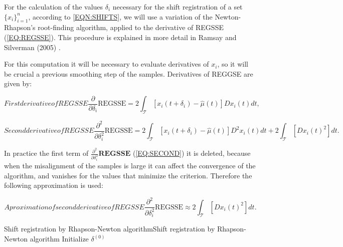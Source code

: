 

For the calculation of the values $\delta_i$ necessary for the shift registration of a set  $\{x_i\}_{i=1}^{n}$, according to \ref{EQN:SHIFTS},
we will use a variation of the Newton-Rhapson's root-finding algorithm, applied
to the derivative of REGSSE (\ref{EQ:REGSSE}). This procedure is explained in more detail
in Ramsay and Silverman (2005) \cite{Ramsay2005}.

For this computation it will be necessary to evaluate derivatives of
$x_i$, so it will be crucial a previous smoothing step of the samples.
Derivatives of REGGSE are given by:

\begin{equation}[EQ:FIRST]{First derivative of REGSSE}
\frac{\partial}{\partial \delta_i} \text{REGSSE} = 2 \int_{\mathcal{T}}
\left [ x_i(t + \delta_i) - \hat \mu(t) \right ] Dx_i(t) dt,
\end{equation}

\begin{equation}[EQ:SECOND]{Second derivative of REGSSE}
\frac{\partial^2}{\partial \delta^2_i} \text{REGSSE} = 2
\int_{\mathcal{T}} \left [ x_i(t + \delta_i) - \hat \mu(t) \right ]
D^2x_i(t) dt + 2 \int_{\mathcal{T}} \left [  Dx_i(t)^2 \right ]  dt.
\end{equation}

In practice the first term of $\frac{\partial^2}{\partial \delta^2_i}\textbf{REGSSE}$
(\ref{EQ:SECOND}) it is deleted, because when the misalignment of the samples is large it
can affect the convergence of the algorithm, and vanishes for the values that
minimize the criterion. Therefore the following approximation is used:

\begin{equation}[]{Aproximation of second derivative of REGSSE}
\frac{\partial^2}{\partial \delta^2_i} \text{REGSSE} \approx  
2 \int_{\mathcal{T}} \left [  Dx_i(t)^2 \right ]  dt.
\end{equation}

\begin{algorithmN}{Shift registration by Rhapson-Newton algorithm}{Shift registration by Rhapson-Newton algorithm}
	\BlankLine
	Initialize $\delta^{(0)}$ \;
	
\end{algorithmN}

